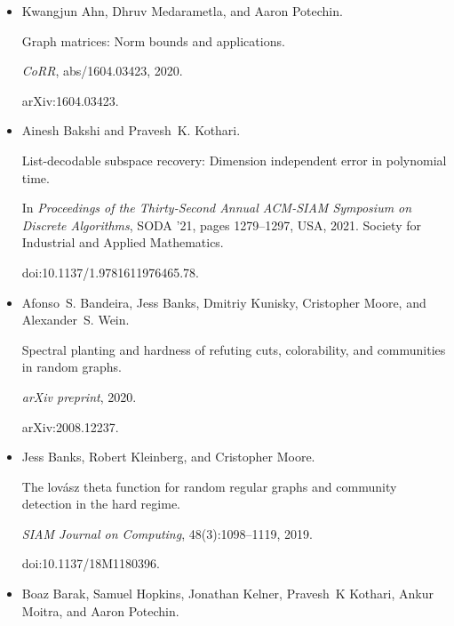 \begin{itemize}


\item[] 
[1]

Kwangjun Ahn, Dhruv Medarametla, and Aaron Potechin.


Graph matrices: Norm bounds and applications.


\emph{CoRR}, abs/1604.03423, 2020.


arXiv:1604.03423.





\item[] 
[2]

Ainesh Bakshi and Pravesh K. Kothari.


List-decodable subspace recovery: Dimension independent error in
polynomial time.


In \emph{Proceedings of the Thirty-Second Annual ACM-SIAM Symposium on
Discrete Algorithms}, SODA ’21, pages 1279–1297, USA, 2021. Society for
Industrial and Applied Mathematics.


doi:10.1137/1.9781611976465.78.





\item[] 
[3]

Afonso S. Bandeira, Jess Banks, Dmitriy Kunisky, Cristopher Moore, and
Alexander S. Wein.


Spectral planting and hardness of refuting cuts, colorability, and
communities in random graphs.


\emph{arXiv preprint}, 2020.


arXiv:2008.12237.





\item[] 
[4]

Jess Banks, Robert Kleinberg, and Cristopher Moore.


The lovász theta function for random regular graphs and community
detection in the hard regime.


\emph{SIAM Journal on Computing}, 48(3):1098–1119, 2019.


doi:10.1137/18M1180396.





\item[] 
[5]

Boaz Barak, Samuel Hopkins, Jonathan Kelner, Pravesh K Kothari, Ankur Moitra,
and Aaron Potechin.



\end{itemize}
